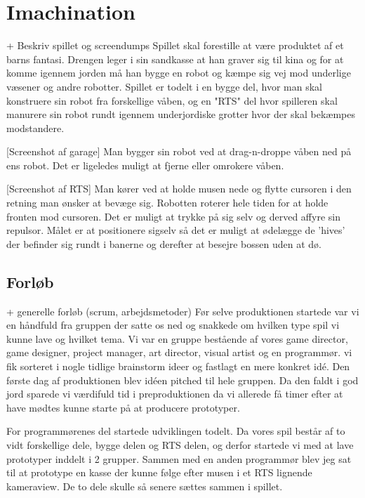 



\section{Imachination}
                + Beskriv spillet og screendumps
Spillet skal forestille at være produktet af et barns fantasi. Drengen leger i sin sandkasse at han graver sig til kina og for at komme igennem jorden må han bygge en robot og kæmpe sig vej mod underlige væsener og andre robotter.
Spillet er todelt i en bygge del, hvor man skal konstruere sin robot fra forskellige våben, og en "RTS" del hvor spilleren skal manurere sin robot rundt igennem underjordiske grotter hvor der skal bekæmpes modstandere.

[Screenshot af garage]
Man bygger sin robot ved at drag-n-droppe våben ned på ens robot. Det er ligeledes muligt at fjerne eller omrokere våben.

[Screenshot af RTS]
Man kører ved at holde musen nede og flytte cursoren i den retning man ønsker at bevæge sig. Robotten roterer hele tiden for at holde fronten mod cursoren. Det er muligt at trykke på sig selv og derved affyre sin repulsor. Målet er at positionere sigselv så det er muligt at ødelægge de 'hives' der befinder sig rundt i banerne og derefter at besejre bossen uden at dø.

\subsection{Forløb}

                + generelle forløb (scrum, arbejdsmetoder)
Før selve produktionen startede var vi en håndfuld fra gruppen der satte os ned og snakkede om hvilken type spil vi kunne lave og hvilket tema. Vi var en gruppe bestående af vores game director, game designer, project manager, art director, visual artist og en programmør. vi fik sorteret i nogle tidlige brainstorm ideer og fastlagt en mere konkret idé. Den første dag af produktionen blev idéen pitched til hele gruppen. Da den faldt i god jord sparede vi værdifuld tid i preproduktionen da vi allerede få timer efter at have mødtes kunne starte på at producere prototyper.

For programmørenes del startede udviklingen todelt. Da vores spil består af to vidt forskellige dele, bygge delen og RTS delen, og derfor startede vi med at lave prototyper inddelt i 2 grupper. Sammen med en anden programmør blev jeg sat til at prototype en kasse der kunne følge efter musen i et RTS lignende kameraview. De to dele skulle så senere sættes sammen i spillet.

